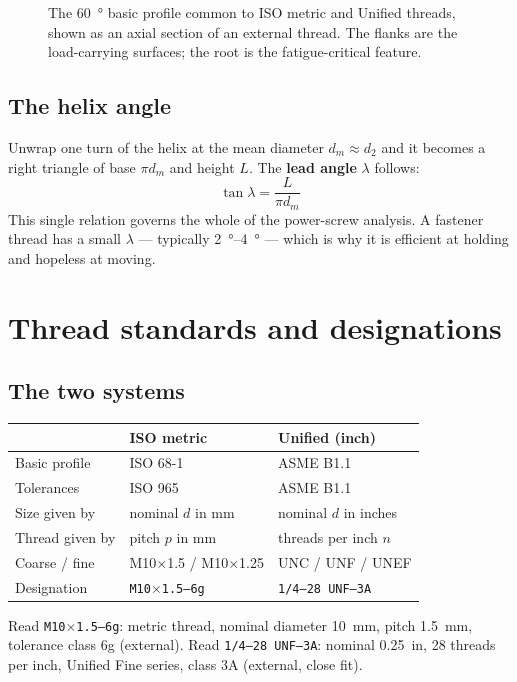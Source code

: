 \documentclass[11pt,a4paper]{article}
\begin{document}
\begin{figure}[H]\centering

\caption{The \SI{60}{\degree} basic profile common to ISO metric and Unified threads, shown as an axial
section of an external thread. The flanks are the load-carrying surfaces; the root is the fatigue-critical
feature.}
\end{figure}

\subsection{The helix angle}\label{sec:helix}

Unwrap one turn of the helix at the mean diameter $d_m \approx d_2$ and it becomes a right triangle of
base $\pi d_m$ and height $L$. The \textbf{lead angle} $\lambda$ follows:
\[
\boxed{\,\tan\lambda = \frac{L}{\pi d_m}\,}
\]
This single relation governs the whole of the power-screw analysis. A fastener thread has a small
$\lambda$ --- typically \SIrange{2}{4}{\degree} --- which is why it is efficient at holding and hopeless
at moving.

\section{Thread standards and designations}

\subsection{The two systems}

\begin{center}\small
\begin{tabular}{@{}lll@{}}
\toprule
 & \textbf{ISO metric} & \textbf{Unified (inch)}\\
\midrule
Basic profile & ISO 68-1 & ASME B1.1\\
Tolerances & ISO 965 & ASME B1.1\\
Size given by & nominal $d$ in mm & nominal $d$ in inches\\
Thread given by & pitch $p$ in mm & threads per inch $n$\\
Coarse / fine & M10$\times$1.5 / M10$\times$1.25 & UNC / UNF / UNEF\\
Designation & \texttt{M10$\times$1.5--6g} & \texttt{1/4--28 UNF--3A}\\
\bottomrule
\end{tabular}
\end{center}

\medskip
Read \texttt{M10$\times$1.5--6g}: metric thread, nominal diameter \SI{10}{mm}, pitch \SI{1.5}{mm},
tolerance class 6g (external). Read \texttt{1/4--28 UNF--3A}: nominal \SI{0.25}{in}, 28 threads per
inch, Unified Fine series, class 3A (external, close fit).
\end{document}
